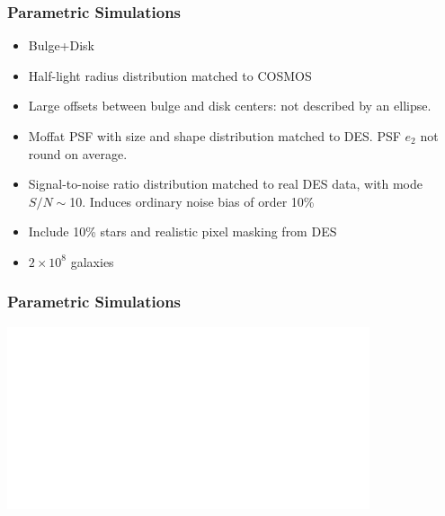 \documentclass{beamer}
\begin{document}
\frame
{
    \frametitle{Parametric Simulations}

 
    \begin{itemize}

        \item {\color{gold} Bulge+Disk}

        \item Half-light radius distribution matched to COSMOS

        \item Large offsets between bulge and disk centers:
            {\color{lightskyblue} not described by an ellipse}.

        \item Moffat PSF with size and shape distribution
            matched to DES.  PSF $e_2$ not round on average.

        \item Signal-to-noise ratio distribution matched to real DES
            data, with {\color{lightskyblue} mode $S/N \sim$10}.  Induces ordinary noise
            bias of order 10\%
        
        \item Include 10\% {\color{brightred} stars} and realistic pixel
            {\color{orange} masking} from DES

        \item $2 \times 10^8$ galaxies


    \end{itemize}

}

\frame
{
    \frametitle{Parametric Simulations}
 
    \begin{center}
        \includegraphics[width=0.8\textwidth]{s2n-bd16-icolor.pdf}
    \end{center}

}
\end{document}
